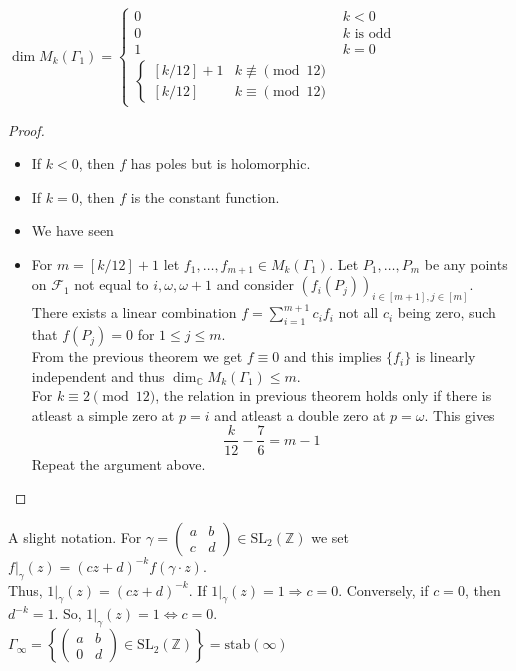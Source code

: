 \documentclass[oneside, 12pt, ]{scrbook}
\newcommand{\CC}{\mathbb C}
\newcommand{\ZZ}{\mathbb Z}
\theoremstyle{theorem}
\begin{document}
\begin{corollary}
$\dim M_{k}(\Gamma_{1}) = \begin{cases} 0 & k < 0 \\ 0 & k \text{ is odd } \\ 1 & k=0 \\ \begin{cases}[k/12]+1 & k\not \equiv \pmod{12} \\ [k/12] & k \equiv \pmod{12} \end{cases} \end{cases}$
\end{corollary}

\begin{proof}
\begin{itemize}
\item If $k <0$, then $f$ has poles but is holomorphic.
\item  If $k=0$, then $f$ is the constant function. 
\item We have seen
\item For $m = [k/12] + 1$ let $f_{1}, \hdots , f_{m+1} \in M_{k}(\Gamma_{1})$. Let $P_{1}, \hdots , P_{m}$ be any points on $\mathcal{F}_{1}$ not equal to $i , \omega , \omega + 1$ and consider $(f_{i}(P_{j}))_{i \in [m+1], j \in [m]}$. \\
There exists a linear combination $f = \sum_{i=1}^{m+1} c_{i}f_{i}$ not all $c_{i}$ being zero, such that $f(P_{j})=0$ for $1 \le j \le m$. \\
From the previous theorem we get $f \equiv 0$ and this implies $\{f_{i}\}$ is linearly independent and thus $\dim_{\CC} M_{k}(\Gamma_{1}) \le m$. \\
For $k \equiv 2 \pmod{12}$, the relation in previous theorem holds only if there is atleast a simple zero at $p=i$ and atleast a double zero at $p = \omega$. This gives $$\frac{k}{12} - \frac{7}{6} = m-1$$ Repeat the argument above.  
\end{itemize}
\end{proof}

A slight notation. For $\gamma  = \begin{pmatrix}
a & b \\ c & d
\end{pmatrix} \in \mathrm{SL}_{2} (\ZZ)$ we set $f|_{\gamma} (z) = (cz+d)^{-k}f(\gamma \cdot z)$. \\
Thus, $1|_{\gamma}(z) = (cz+d)^{-k}$. If $1|_{\gamma}(z) =1 \Rightarrow c =0$. Conversely, if $c=0$, then $d^{-k}=1$. So, $1|_{\gamma}(z)=1 \Leftrightarrow c=0$. \\
$\Gamma_{\infty} = \left\{ \begin{pmatrix}
a & b \\ 0 & d 
\end{pmatrix} \in \mathrm{SL}_{2}(\ZZ) \right\} = \mathrm{stab}(\infty)$
\end{document}
